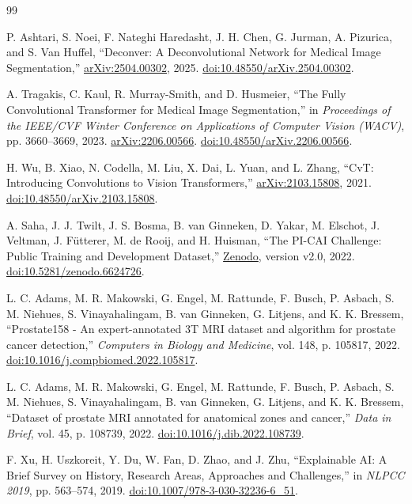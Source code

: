 \documentclass[11pt,a4paper]{article}
\begin{document}
\begin{thebibliography}{99}

P. Ashtari, S. Noei, F. Nateghi Haredasht, J. H. Chen, G. Jurman, A. Pizurica, and S. Van Huffel,
``Deconver: A Deconvolutional Network for Medical Image Segmentation,''
\href{https://arxiv.org/abs/2504.00302}{arXiv:2504.00302}, 2025. \href{https://doi.org/10.48550/arXiv.2504.00302}{doi:10.48550/arXiv.2504.00302}.

A. Tragakis, C. Kaul, R. Murray-Smith, and D. Husmeier,
``The Fully Convolutional Transformer for Medical Image Segmentation,''
in \textit{Proceedings of the IEEE/CVF Winter Conference on Applications of Computer Vision (WACV)},
pp. 3660--3669, 2023. \href{https://arxiv.org/abs/2206.00566}{arXiv:2206.00566}. \href{https://doi.org/10.48550/arXiv.2206.00566}{doi:10.48550/arXiv.2206.00566}.

H. Wu, B. Xiao, N. Codella, M. Liu, X. Dai, L. Yuan, and L. Zhang,
``CvT: Introducing Convolutions to Vision Transformers,''
\href{https://arxiv.org/abs/2103.15808}{arXiv:2103.15808}, 2021. \href{https://doi.org/10.48550/arXiv.2103.15808}{doi:10.48550/arXiv.2103.15808}.

A. Saha, J. J. Twilt, J. S. Bosma, B. van Ginneken, D. Yakar, M. Elschot, J. Veltman, J. F\"utterer, M. de Rooij, and H. Huisman,
``The PI-CAI Challenge: Public Training and Development Dataset,''
\href{https://zenodo.org/records/6624726}{Zenodo}, version v2.0, 2022. \href{https://doi.org/10.5281/zenodo.6624726}{doi:10.5281/zenodo.6624726}.

L. C. Adams, M. R. Makowski, G. Engel, M. Rattunde, F. Busch, P. Asbach, S. M. Niehues, S. Vinayahalingam, B. van Ginneken, G. Litjens, and K. K. Bressem,
``Prostate158 - An expert-annotated 3T MRI dataset and algorithm for prostate cancer detection,''
\textit{Computers in Biology and Medicine}, vol. 148, p. 105817, 2022. \href{https://doi.org/10.1016/j.compbiomed.2022.105817}{doi:10.1016/j.compbiomed.2022.105817}.

L. C. Adams, M. R. Makowski, G. Engel, M. Rattunde, F. Busch, P. Asbach, S. M. Niehues, S. Vinayahalingam, B. van Ginneken, G. Litjens, and K. K. Bressem,
``Dataset of prostate MRI annotated for anatomical zones and cancer,''
\textit{Data in Brief}, vol. 45, p. 108739, 2022. \href{https://doi.org/10.1016/j.dib.2022.108739}{doi:10.1016/j.dib.2022.108739}.

F. Xu, H. Uszkoreit, Y. Du, W. Fan, D. Zhao, and J. Zhu,
``Explainable AI: A Brief Survey on History, Research Areas, Approaches and Challenges,''
in \textit{NLPCC 2019}, pp. 563--574, 2019. \href{https://doi.org/10.1007/978-3-030-32236-6_51}{doi:10.1007/978-3-030-32236-6\_51}.


\end{thebibliography}
\end{document}
